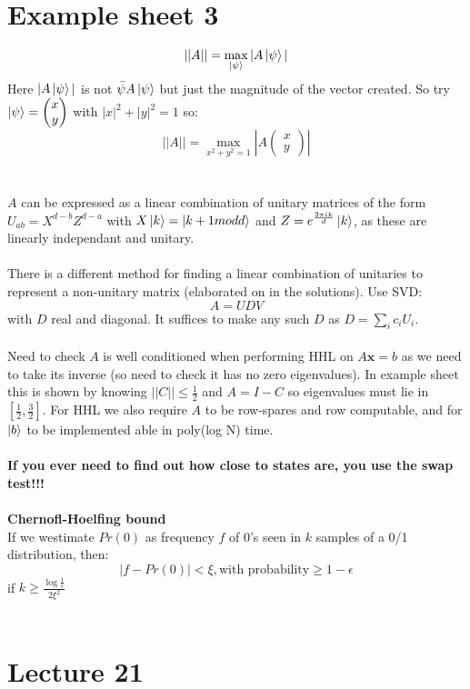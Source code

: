 \documentclass{article}
\begin{document}
\section{Example sheet 3}
$$
 || A || = \max_{\ket{\psi}} |A \ket{\psi}|
$$
Here $|A \ket{\psi}|$ is not $\bar{\psi} A \ket{\psi}$ but just the magnitude of the vector created.
So try $\ket{\psi} = \begin{pmatrix} x \\ y \end{pmatrix}$ with $|x|^2 + |y|^2 = 1$ so:$$
|| A || = \max_{x^2 + y^2 =1} |A \begin{pmatrix} x\\ y \end{pmatrix}|
$$\\\\
$A$ can be expressed as a linear combination of unitary matrices of the form $U_{ab} = X^{d-b} Z^{d-a}$ with $X \ket{k} = \ket{ k + 1 mod d}$ and $Z = e^{ \frac{2\pi i k}{d}} \ket{k}$, as these are linearly independant and unitary.\\\\
There is a different method for finding a linear combination of unitaries to represent a non-unitary matrix (elaborated on in the solutions). Use SVD:
$$
A = UDV
$$
with $D$ real and diagonal. It suffices to make any such $D$ as $D = \sum_i c_i U_i$.\\\\
Need to check $A$ is well conditioned when performing HHL on $A\bm x = b$ as we need to take its inverse (so need to check it has no zero eigenvalues). In example sheet this is shown by knowing $||C|| \leq \frac{1}{2}$ and $A = I - C$ so eigenvalues must lie in $[\frac{1}{2}, \frac{3}{2}]$. For HHL we also require $A$ to be row-spares and row computable, and for $\ket{b}$ to be implemented able in poly(log N) time.\\\\
\textbf{If you ever need to find out how close to states are,  you use the swap test!!!}\\\\
\textbf{Chernofl-Hoelfing bound}\\
If we westimate $Pr(0)$ as frequency $f$ of 0's seen in $k$ samples of a 0/1 distribution, then:
$$
 |f - Pr(0)| < \xi, \text{with probability} \geq 1 - \epsilon
$$
if $k \geq \frac{\log \frac{1}{\epsilon}}{2 \xi^2}$\\\\
\section{Lecture 21}
\end{document}
